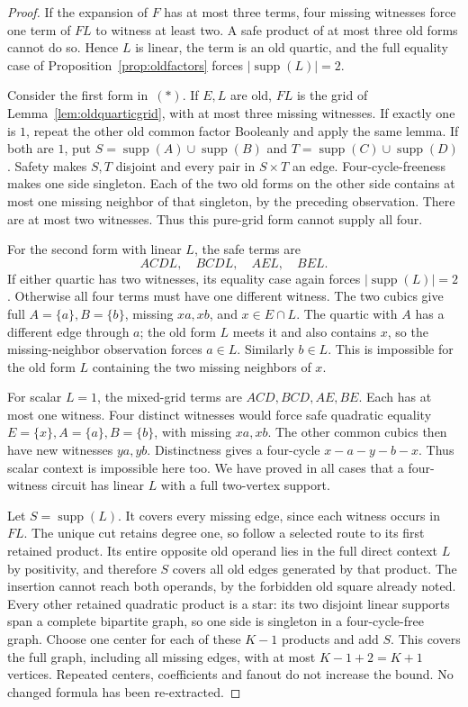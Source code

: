 \documentclass[11pt]{article}
\newcommand{\supp}{\operatorname{supp}}
\theoremstyle{definition}
\theoremstyle{remark}
\begin{document}
\begin{proof}
If the expansion of $F$ has at most three terms, four missing witnesses
force one term of $FL$ to witness at least two. A safe product of at most
three old forms cannot do so. Hence $L$ is linear, the term is an old
quartic, and the full equality case of Proposition~\ref{prop:oldfactors}
forces $|\supp(L)|=2$.

Consider the first form in~$(*)$. If $E,L$ are old, $FL$ is the grid of
Lemma~\ref{lem:oldquarticgrid}, with at most three missing witnesses.
If exactly one is $1$, repeat the other old common factor Booleanly and
apply the same lemma. If both are $1$, put
$S=\supp(A)\cup\supp(B)$ and $T=\supp(C)\cup\supp(D)$.
Safety makes $S,T$ disjoint and every pair in $S\times T$ an edge.
Four-cycle-freeness makes one side singleton. Each of the two old forms
on the other side contains at most one missing neighbor of that singleton,
by the preceding observation. There are at most two witnesses.
Thus this pure-grid form cannot supply all four.

For the second form with linear $L$, the safe terms are
\[
 ACDL,\quad BCDL,\quad AEL,\quad BEL.
\]
If either quartic has two witnesses, its equality case again forces
$|\supp(L)|=2$. Otherwise all four terms must have one different witness.
The two cubics give full $A=\{a\},B=\{b\}$, missing $xa,xb$, and
$x\in E\cap L$. The quartic with $A$ has a different edge through $a$;
the old form $L$ meets it and also contains $x$, so the missing-neighbor
observation forces $a\in L$. Similarly $b\in L$. This is impossible
for the old form $L$ containing the two missing neighbors of $x$.

For scalar $L=1$, the mixed-grid terms are $ACD,BCD,AE,BE$.
Each has at most one witness. Four distinct witnesses would force safe
quadratic equality $E=\{x\},A=\{a\},B=\{b\}$, with missing
$xa,xb$. The other common cubics then have new witnesses $ya,yb$.
Distinctness gives a four-cycle $x-a-y-b-x$. Thus scalar context is
impossible here too. We have proved in all cases that a four-witness
circuit has linear $L$ with a full two-vertex support.

Let $S=\supp(L)$. It covers every missing edge, since each witness occurs
in $FL$. The unique cut retains degree one, so follow a selected route
to its first retained product. Its entire opposite old operand lies in
the full direct context $L$ by positivity, and therefore $S$ covers
all old edges generated by that product. The insertion cannot reach both
operands, by the forbidden old square already noted. Every other retained
quadratic product is a star: its two disjoint linear supports span a
complete bipartite graph, so one side is singleton in a four-cycle-free
graph. Choose one center for each of these $K-1$ products and add $S$.
This covers the full graph, including all missing edges, with at most
$K-1+2=K+1$ vertices. Repeated centers, coefficients and fanout do not
increase the bound. No changed formula has been re-extracted.
\end{proof}
\end{document}
